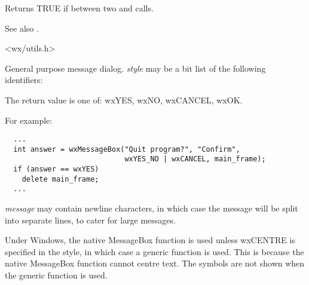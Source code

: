 Returns TRUE if between two  and\rtfsp
{} calls.

See also .


<wx/utils.h>

\label{wxmessagebox}


General purpose message dialog.  {\it style} may be a bit list of the
following identifiers:

\begin{twocollist}\itemsep=0pt
\end{twocollist}

The return value is one of: wxYES, wxNO, wxCANCEL, wxOK.

For example:

\begin{verbatim}
  ...
  int answer = wxMessageBox("Quit program?", "Confirm",
                            wxYES_NO | wxCANCEL, main_frame);
  if (answer == wxYES)
    delete main_frame;
  ...
\end{verbatim}

{\it message} may contain newline characters, in which case the
message will be split into separate lines, to cater for large messages.

Under Windows, the native MessageBox function is used unless wxCENTRE
is specified in the style, in which case a generic function is used.
This is because the native MessageBox function cannot centre text.
The symbols are not shown when the generic function is used.

